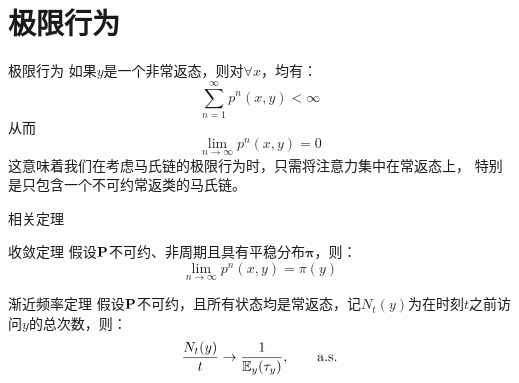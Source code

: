 \documentclass[t]{beamer}
\newcommand{\E}{\mathbb{E}}
\begin{document}
\section{极限行为}
\begin{frame}{极限行为}
    如果$y$是一个非常返态，则对$\forall x$，均有：
    \[\sum_{n=1}^{\infty}p^n(x,y)<\infty \]
    从而
    $$\lim_{n\to\infty}p^n(x,y)= 0$$
    这意味着我们在考虑马氏链的极限行为时，只需将注意力集中在常返态上，
    特别是只包含一个不可约常返类的马氏链。
\end{frame}




\begin{frame}{相关定理}
    \begin{block}{收敛定理}
        假设${\bf P}$不可约、非周期且具有平稳分布$\bm{\pi}$，则：
        \begin{equation*}
        \lim_{n\to\infty}p^n(x,y)= \pi(y)
        \end{equation*}
    \end{block}
    
    \begin{block}{渐近频率定理}
        假设${\bf P}$不可约，且所有状态均是常返态，记$N_t(y)$为在时刻$t$之前访问$y$的总次数，则：
        \begin{equation*}
        \frac{N_t(y)}{t}\to \frac{1}{\E_y(\tau_y)},\qquad {\rm a.s.} 
        \end{equation*}
    \end{block}
\end{frame}
\end{document}
